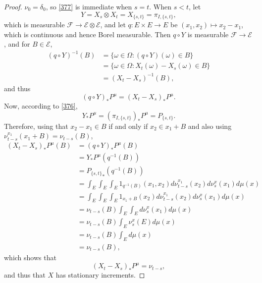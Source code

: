 \documentclass{article}
\theoremstyle{definition}
\theoremstyle{definition}
\begin{document}
\begin{proof}
$\nu_0=\delta_0$, so \eqref{377} is immediate when $s=t$. When $s<t$,
let 
\[
Y=X_s \otimes X_t=X_{\{s,t\}}=\pi_{I,\{s,t\}},
\]
which is measurable $\mathscr{F} \to \mathscr{E} \otimes \mathscr{E}$,
and let $q:E \times E \to E$ be
$(x_1,x_2) \mapsto x_2-x_1$, which is continuous and hence Borel measurable.
Then $q \circ Y$ is measurable $\mathscr{F} \to \mathscr{E}$, and for $B \in \mathscr{E}$, 
\begin{align*}
(q \circ Y)^{-1}(B) &= \{\omega \in \Omega: (q \circ Y)(\omega) \in  B\}\\
&=\{\omega \in \Omega: X_t(\omega)-X_s(\omega) \in B\}\\
&=(X_t-X_s)^{-1}(B),
\end{align*}
and thus
\begin{equation}
(q \circ Y)_*P^\mu = (X_t-X_s)_*P^\mu.
\label{qY}
\end{equation}
Now, according to \eqref{376},
\[
Y_*P^\mu = (\pi_{I,\{s,t\}})_*P^\mu = P_{\{s,t\}}.
\]
Therefore, using that $x_2-x_1 \in B$ if and only if $x_2 \in x_1+B$ and also using
$\nu_{t-s}^{x_1}(x_1+B)=\nu_{t-s}(B)$,
\begin{align*}
(X_t-X_s)_*P^\mu(B)&=(q \circ Y)_*P^\mu(B)\\
&=Y_*P^\mu(q^{-1}(B))\\
&={P_{\{s,t\}}}_*(q^{-1}(B))\\
&=\int_E \int_E \int_E 1_{q^{-1}(B)}(x_1,x_2) d\nu_{t-s}^{x_1}(x_2) d\nu_s^{x}(x_1) d\mu(x)\\
&=\int_E \int_E \int_E 1_{x_1+B}(x_2)  d\nu_{t-s}^{x_1}(x_2) d\nu_s^{x}(x_1) d\mu(x)\\
&=\nu_{t-s}(B) \int_E \int_E  d\nu_s^{x}(x_1) d\mu(x)\\
&=\nu_{t-s}(B) \int_E \nu_s^x(E) d\mu(x)\\
&=\nu_{t-s}(B) \int_E d\mu(x)\\
&=\nu_{t-s}(B),
\end{align*}
which shows that
\[
(X_t-X_s)_*P^\mu = \nu_{t-s},
\]
and thus that $X$ has stationary increments.


\end{proof}
\end{document}
